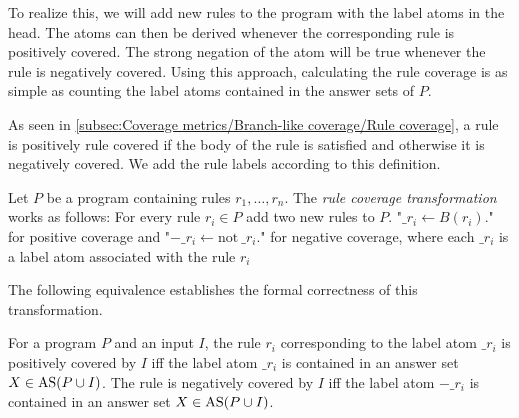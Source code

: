To realize this, we will add new rules to the program with the label atoms in the head. The atoms can then be derived whenever the corresponding rule is positively covered. The strong negation of the atom will be true whenever the rule is negatively covered. Using this approach, calculating the rule coverage is as simple as counting the label atoms contained in the answer sets of $P$.

As seen in \cref{subsec:Coverage metrics/Branch-like coverage/Rule coverage}, a rule is positively rule covered if the body of the rule is satisfied and otherwise it is negatively covered. We add the rule labels according to this definition.

\begin{definition}
\label{def:rule transformation}
    Let $P$ be a program containing rules \(r_1, \ldots, r_n\). The \emph{rule coverage transformation} works as follows: For every rule \(r_i \in P\) add two new rules to $P$. "\(\_r_i \leftarrow B(r_i).\)" for positive coverage and "\(-\_r_i \leftarrow \text{not}\ \_r_i.\)" for negative coverage, where each $\_r_i$ is a label atom associated with the rule $r_i$
\end{definition}

The following equivalence establishes the formal correctness of this transformation.
\begin{theorem}
\label{th:rule transformation}
    For a program $P$ and an input $I$, the rule $r_i$ corresponding to the label atom $\_r_i$ is positively covered by $I$ iff the label atom $\_r_i$ is contained in an answer set \(X \in \operatorname{AS}(P \cup I)\). The rule is negatively covered by $I$ iff the label atom $-\_r_i$ is contained in an answer set \(X \in \operatorname{AS}(P \cup I)\).

\end{theorem}

